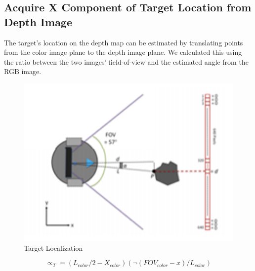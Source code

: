 \subsection{Acquire X Component of Target Location from Depth Image}
The target’s location on the depth map can be estimated by translating points from the color image plane to the depth image plane.  We calculated this using the ratio between the two images’ field-of-view and the estimated angle from the RGB image.

\begin{figure}[htbp]
\begin{center}
\includegraphics[width=5in]{6}
\caption{Target Localization} \label{fig:6}
\end{center}
\end{figure}

\begin{equation}
∝_T=(L_{color}/2-X_{color} )(¬(FOV_{color}-x)/L_{color} )
\end{equation}

